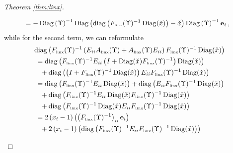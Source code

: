 \documentclass[smallextended]{svjour3hack}       %
\DeclareMathOperator{\Diag}{Diag}
\DeclareMathOperator{\diag}{diag}
\begin{document}
\begin{proof}[Theorem \ref{thm:linx}]
\begin{itemize}
\begin{align*}
     & ~=-  \Diag\left(\Upsilon\right)^{-1} \Diag\left(\diag\left(F_{{\tiny\mbox{linx}}}(\Upsilon)^{-1}\Diag(\check{x})\right)-\check{x}\right) \Diag\left(\Upsilon\right)^{-1} \mathbf{e}_i\,,
 \end{align*}
 while for the second term, we can reformulate
 \begin{align*}
     &\diag\left(F_{{\tiny\mbox{linx}}}(\Upsilon)^{-1}\left(E_{ii}A_{{\tiny\mbox{linx}}}(\Upsilon)+A_{{\tiny\mbox{linx}}}(\Upsilon) E_{ii}\right) F_{{\tiny\mbox{linx}}}(\Upsilon)^{-1}\Diag(\check{x})\right)\\
     &~= \diag\left(F_{{\tiny\mbox{linx}}}(\Upsilon)^{-1}E_{ii}\left(I + \Diag(\check{x}) F_{{\tiny\mbox{linx}}}(\Upsilon)^{-1}\right)\Diag(\check{x})\right) \\
     & \quad + \diag\left(\left(I+ F_{{\tiny\mbox{linx}}}(\Upsilon)^{-1}\Diag(\check{x})\right)E_{ii} F_{{\tiny\mbox{linx}}}(\Upsilon)^{-1}\Diag(\check{x})\right)\\
     &~= \diag\left(F_{{\tiny\mbox{linx}}}(\Upsilon)^{-1}E_{ii}\Diag(\check{x})\right)+ \diag\left( E_{ii}F_{{\tiny\mbox{linx}}}(\Upsilon)^{-1}\Diag(\check{x})\right)\\
     & \quad + \diag\left(F_{{\tiny\mbox{linx}}}(\Upsilon)^{-1}E_{ii} \Diag(\check{x}) F_{{\tiny\mbox{linx}}}(\Upsilon)^{-1}\Diag(\check{x})\right)\\
     &\quad + \diag\left( F_{{\tiny\mbox{linx}}}(\Upsilon)^{-1}\Diag(\check{x})E_{ii} F_{{\tiny\mbox{linx}}}(\Upsilon)^{-1}\Diag(\check{x})\right)\\
     &~= 2\left(x_i-1\right)\left( \left(F_{{\tiny\mbox{linx}}}(\Upsilon)^{-1}\right)_{ii} \mathbf{e}_i\right)\\
     &\quad + 2\left(x_i-1\right)\left(\diag\left(F_{{\tiny\mbox{linx}}}(\Upsilon)^{-1}E_{ii} F_{{\tiny\mbox{linx}}}(\Upsilon)^{-1}\Diag(\check{x})\right)\right)\\

\end{align*}
\end{itemize}
\end{proof}
\end{document}
